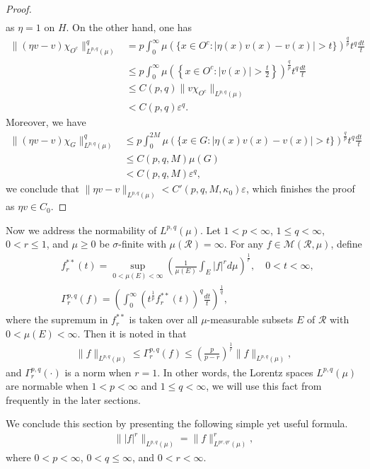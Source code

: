 \documentclass[10pt,reqno]{amsart}
\numberwithin{equation}{section}
\begin{document}
\begin{proof}
\begin{align*}
\end{align*}
as $\eta=1$ on $H$. On the other hand, one has
\begin{align*}
\|(\eta v-v)\chi_{O^{c}}\|_{L^{p,q}(\mu)}^{q}&=p\int_{0}^{\infty}\mu(\{x\in O^{c}:|\eta(x)v(x)-v(x)|>t\})^{\frac{q}{p}}t^{q}\frac{dt}{t}\\
&\leq p\int_{0}^{\infty}\mu\left(\left\{x\in O^{c}:|v(x)|>\frac{t}{2}\right\}\right)^{\frac{q}{p}}t^{q}\frac{dt}{t}\\
&\leq C(p,q)\|v\chi_{O^{c}}\|_{L^{p,q}(\mu)}\\
&<C(p,q)\varepsilon^{q}.
\end{align*}
Moreover, we have
\begin{align*}
\|(\eta v-v)\chi_{G}\|_{L^{p,q}(\mu)}^{q}&\leq p\int_{0}^{2M}\mu(\{x\in G:|\eta(x)v(x)-v(x)|>t\})^{\frac{q}{p}}t^{q}\frac{dt}{t}\\
&\leq C(p,q,M)\mu(G)\\
&<C(p,q,M)\varepsilon^{q},
\end{align*}
we conclude that $\|\eta v-v\|_{L^{p,q}(\mu)}<C'(p,q,M,\kappa_{0})\varepsilon$, which finishes the proof as $\eta v\in C_{0}$.
\end{proof}

Now we address the normability of $L^{p,q}(\mu)$. Let $1<p<\infty$, $1\leq q<\infty$, $0<r\leq 1$, and $\mu\geq 0$ be  $\sigma$-finite with $\mu(\mathcal{R})=\infty$. For any $f\in\mathcal{M}(\mathcal{R},\mu)$, define
\begin{align*}
&f_{r}^{\ast\ast}(t)=\sup_{0<\mu(E)<\infty}\left(\frac{1}{\mu(E)}\int_{E}|f|^{r}d\mu\right)^{\frac{1}{r}},\quad 0<t<\infty,\\
&\Gamma_{r}^{p,q}(f)=\left(\int_{0}^{\infty}(t^{\frac{1}{p}}f_{r}^{\ast\ast}(t))^{q}\frac{dt}{t}\right)^{\frac{1}{q}},
\end{align*}
where the supremum in $f_{r}^{\ast\ast}$ is taken over all $\mu$-measurable subsets $E$ of $\mathcal{R}$ with $0<\mu(E)<\infty$. Then it is noted in \cite[Exercise 1.4.3]{GL} that 
\begin{align*}
\|f\|_{L^{p,q}(\mu)}\leq\Gamma_{r}^{p,q}(f)\leq\left(\frac{p}{p-r}\right)^{\frac{1}{r}}\|f\|_{L^{p,q}(\mu)},
\end{align*}
and $\Gamma_{r}^{p,q}(\cdot)$ is a norm when $r=1$. In other words, the Lorentz spaces $L^{p,q}(\mu)$ are normable when $1<p<\infty$ and $1\leq q<\infty$, we will use this fact from frequently in the later sections.

We conclude this section by presenting the following simple yet useful formula.
\begin{align*}
\||f|^{r}\|_{L^{p,q}(\mu)}=\|f\|_{L^{pr,qr}(\mu)}^{r},
\end{align*}
where $0<p<\infty$, $0<q\leq\infty$, and $0<r<\infty$.
\end{document}
